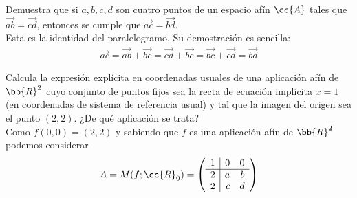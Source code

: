 \documentclass[12pt]{article}
\begin{document}
    \begin{ejercicio}[2 puntos]
        Demuestra que si $a,b,c,d$ son cuatro puntos de un espacio afín $\cc{A}$ tales que $\vec{ab}=\vec{cd}$, entonces se cumple que $\vec{ac}= \vec{bd}$.\\

        Esta es la identidad del paralelogramo. Su demostración es sencilla:
        \begin{gather*}
            \vec{ac}=\vec{ab}+\vec{bc}=\vec{cd}+\vec{bc}=\vec{bc}+\vec{cd}=\vec{bd}
        \end{gather*}
    \end{ejercicio}

    \begin{ejercicio}[3 puntos]
        Calcula la expresión explícita en coordenadas usuales de una aplicación afín de $\bb{R}^2$ cuyo conjunto de puntos fijos sea la recta de ecuación implícita $x=1$ (en coordenadas de sistema de referencia usual) y tal que la imagen del origen sea el punto $(2,2)$. ¿De qué aplicación se trata?\\


        Como $f(0,0)=(2,2)$ y sabiendo que $f$ es una aplicación afín de $\bb{R}^2$ podemos considerar
        \begin{gather*}
            A=M(f;\cc{R}_0)=\left(
            \begin{array}{r|rr}
                1 & 0 & 0 \\
                \hline
                2 & a & b \\
                2 & c & d \\
            \end{array}\right)
        \end{gather*}


\end{ejercicio}
\end{document}
